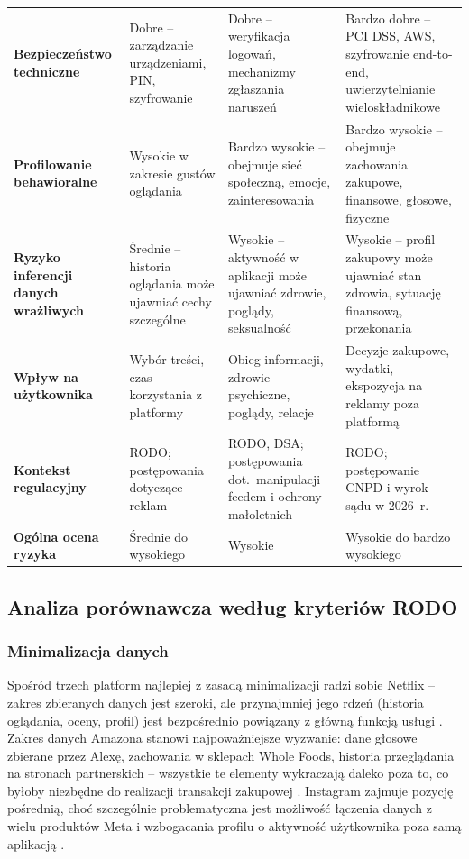 \documentclass[12pt, a4paper]{article}
\begin{document}
\begin{longtable}{>{\bfseries\small}p{3.4cm}
                  >{\small\raggedright}p{3.4cm}
                  >{\small\raggedright}p{3.4cm}
                  >{\small\raggedright\arraybackslash}p{3.4cm}}
  \rowcolor{lightblue}
  Bezpieczeństwo techniczne &
  Dobre -- zarządzanie urządzeniami, PIN, szyfrowanie &
  Dobre -- weryfikacja logowań, mechanizmy zgłaszania naruszeń &
  Bardzo dobre -- PCI DSS, AWS, szyfrowanie end-to-end, uwierzytelnianie wieloskładnikowe \\

  Profilowanie behawioralne &
  Wysokie w zakresie gustów oglądania &
  Bardzo wysokie -- obejmuje sieć społeczną, emocje, zainteresowania &
  Bardzo wysokie -- obejmuje zachowania zakupowe, finansowe, głosowe, fizyczne \\

  \rowcolor{lightblue}
  Ryzyko inferencji danych wrażliwych &
  Średnie -- historia oglądania może ujawniać cechy szczególne &
  Wysokie -- aktywność w aplikacji może ujawniać zdrowie, poglądy, seksualność &
  Wysokie -- profil zakupowy może ujawniać stan zdrowia, sytuację finansową, przekonania \\

  Wpływ na użytkownika &
  Wybór treści, czas korzystania z platformy &
  Obieg informacji, zdrowie psychiczne, poglądy, relacje &
  Decyzje zakupowe, wydatki, ekspozycja na reklamy poza platformą \\

  \rowcolor{lightblue}
  Kontekst regulacyjny &
  RODO; postępowania dotyczące reklam &
  RODO, DSA; postępowania dot.\ manipulacji feedem i ochrony małoletnich &
  RODO; postępowanie CNPD i wyrok sądu w 2026~r.\ \\

  Ogólna ocena ryzyka &
  Średnie do wysokiego &
  Wysokie &
  Wysokie do bardzo wysokiego \\
\end{longtable}

\subsection{Analiza porównawcza według kryteriów RODO}

\subsubsection{Minimalizacja danych}

Spośród trzech platform najlepiej z zasadą minimalizacji radzi sobie Netflix -- zakres zbieranych danych jest szeroki, ale przynajmniej jego rdzeń (historia oglądania, oceny, profil) jest bezpośrednio powiązany z główną funkcją usługi \cite{netflix_data, netflix_recs}. Zakres danych Amazona stanowi najpoważniejsze wyzwanie: dane głosowe zbierane przez Alexę, zachowania w sklepach Whole Foods, historia przeglądania na stronach partnerskich -- wszystkie te elementy wykraczają daleko poza to, co byłoby niezbędne do realizacji transakcji zakupowej \cite{amazon_privacy, rodo}. Instagram zajmuje pozycję pośrednią, choć szczególnie problematyczna jest możliwość łączenia danych z wielu produktów Meta i wzbogacania profilu o aktywność użytkownika poza samą aplikacją \cite{meta_privacy, himeur2022}.
\end{document}
